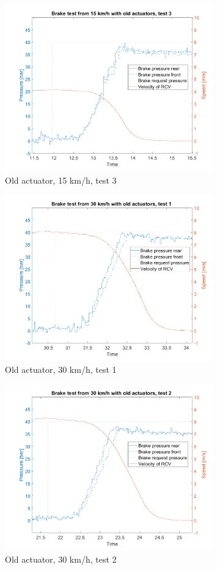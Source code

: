 \documentclass[a4paper,11pt]{kth-mag}
\begin{document}
\begin{figure}[h]
\centering
\includegraphics[width=0.8\textwidth]{Old_15kph_test3}
\caption{Old actuator, 15 km/h, test 3}
\label{fig:Old_15kph_test3}
\end{figure}

\begin{figure}[h]
\centering
\includegraphics[width=0.8\textwidth]{Old_30kph_test1}
\caption{Old actuator, 30 km/h, test 1}
\label{fig:Old_30kph_test1}
\end{figure}

\begin{figure}[h]
\centering
\includegraphics[width=0.8\textwidth]{Old_30kph_test2}
\caption{Old actuator, 30 km/h, test 2}
\label{fig:Old_30kph_test2}
\end{figure}
\end{document}
